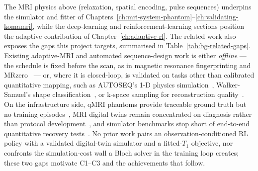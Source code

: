 The MRI physics above (relaxation, spatial encoding, pulse sequences)
underpins the simulator and fitter of
Chapters~\ref{ch:mri-system-phantom}--\ref{ch:validating-komamri}, while the
deep-learning and reinforcement-learning sections position the adaptive
contribution of Chapter~\ref{ch:adaptive-rl}. The related work also exposes
the gaps this project targets, summarised in
Table~\ref{tab:bg-related-gaps}. Existing adaptive-MRI and automated
sequence-design work is either \emph{offline} --- the schedule is fixed
before the scan, as in magnetic resonance fingerprinting and
MRzero~\cite{MRISeqSupLearning:21} --- or, where it is closed-loop, is
validated on tasks other than calibrated quantitative mapping, such as
AUTOSEQ's 1-D physics simulation~\cite{zhu2018autoseq}, Walker-Samuel's
shape classification~\cite{Walk_RL_CONTROL_MRI:19}, or k-space sampling for
reconstruction quality~\cite{pineda_active_mri_rl_2020}. On the
infrastructure side, qMRI phantoms provide traceable ground truth but no
training episodes~\cite{keenan_phantoms_2024}, MRI digital twins remain
concentrated on diagnosis rather than protocol
development~\cite{greggio_digital_twinning_mri_2026}, and simulator
benchmarks stop short of end-to-end quantitative recovery
tests~\cite{komaMRI:23}. No prior work pairs an observation-conditioned RL
policy with a validated digital-twin simulator and a fitted-$T_1$ objective,
nor confronts the simulation-cost wall a Bloch solver in the training loop
creates; these two gaps motivate C1--C3 and the achievements that follow.

